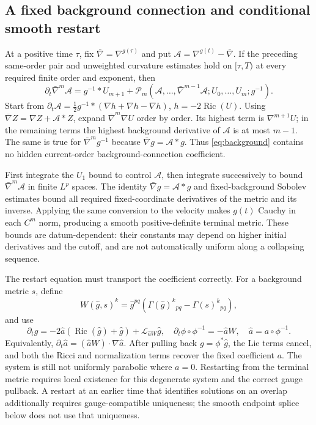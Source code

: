 \documentclass[a4paper,11pt]{article}
\numberwithin{equation}{section}
\theoremstyle{definition}
\newcommand{\Ric}{\operatorname{Ric}}
\begin{document}
\subsection{A fixed background connection and conditional smooth restart}
At a positive time $\tau$, fix $\bar\nabla=\nabla^{g(\tau)}$ and put
$\mathscr A=\nabla^{g(t)}-\bar\nabla$. If the preceding same-order pair and unweighted curvature estimates hold on
$[\tau,T)$ at every required finite order and exponent, then
\begin{equation}\label{eq:background}
\partial_t\bar\nabla^m\mathscr A
=g^{-1}*U_{m+1}
+\mathcal P_m(\mathscr A,\ldots,\bar\nabla^{m-1}\mathscr A;
U_0,\ldots,U_m;g^{-1}).
\end{equation}
Start from
$\partial_t\mathscr A=\tfrac12g^{-1}*(\nabla h+\nabla h-\nabla h)$,
$h=-2\Ric(U)$.
Using $\bar\nabla Z=\nabla Z+\mathscr A*Z$, expand
$\bar\nabla^m\nabla U$ order by order. Its highest term is $\nabla^{m+1}U$;
in the remaining terms the highest background derivative of $\mathscr A$ is at most $m-1$.
The same is true for $\bar\nabla^mg^{-1}$ because
$\bar\nabla g=\mathscr A*g$. Thus \eqref{eq:background} contains no hidden current-order background-connection coefficient.

First integrate the $U_1$ bound to control $\mathscr A$, then integrate successively to bound
$\bar\nabla^m\mathscr A$ in finite $L^p$ spaces.
The identity $\bar\nabla g=\mathscr A*g$ and fixed-background Sobolev estimates bound all required fixed-coordinate derivatives of the metric and its inverse.
Applying the same conversion to the velocity makes $g(t)$ Cauchy in each $C^m$ norm, producing a smooth positive-definite terminal metric.
These bounds are datum-dependent: their constants may depend on higher initial derivatives and the cutoff, and are not automatically uniform along a collapsing sequence.

The restart equation must transport the coefficient correctly. For a background metric $s$, define
\[
W(\widehat g,s)^k=\widehat g^{pq}
(\Gamma(\widehat g)^k{}_{pq}-\Gamma(s)^k{}_{pq}),
\]
and use
\[
\partial_t\widehat g
=-2\widehat a(\Ric(\widehat g)+\widehat g)
+\mathcal L_{\widehat aW}\widehat g,\quad
\partial_t\phi\circ\phi^{-1}=-\widehat aW,\quad
\widehat a=a\circ\phi^{-1}.
\]
Equivalently, $\partial_t\widehat a=(\widehat aW)\cdot\nabla\widehat a$.
After pulling back $g=\phi^*\widehat g$, the Lie terms cancel, and both the Ricci and normalization terms recover the fixed coefficient $a$.
The system is still not uniformly parabolic where $a=0$.
Restarting from the terminal metric requires local existence for this degenerate system and the correct gauge pullback.
A restart at an earlier time that identifies solutions on an overlap additionally requires gauge-compatible uniqueness;
the smooth endpoint splice below does not use that uniqueness.
\end{document}
